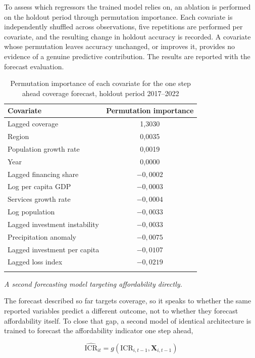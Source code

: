 \documentclass[pdflatex,sn-mathphys-num]{sn-jnl}%
\theoremstyle{thmstyleone}%
\theoremstyle{thmstyletwo}%
\theoremstyle{thmstylethree}%
\begin{document}
To assess which regressors the trained model relies on, an ablation is performed on the holdout period through permutation importance. Each covariate is independently shuffled across observations, five repetitions are performed per covariate, and the resulting change in holdout accuracy is recorded. A covariate whose permutation leaves accuracy unchanged, or improves it, provides no evidence of a genuine predictive contribution. The results are reported with the forecast evaluation.

\begin{table}[h]
\caption{Permutation importance of each covariate for the one step ahead coverage forecast, holdout period 2017--2022}\label{tab_ablation}
\begin{tabular}{@{}lc@{}}
\toprule
Covariate & Permutation importance \\
\midrule
Lagged coverage & 1,3030 \\
Region & 0,0035 \\
Population growth rate & 0,0019 \\
Year & 0,0000 \\
Lagged financing share & $-0{,}0002$ \\
Log per capita GDP & $-0{,}0003$ \\
Services growth rate & $-0{,}0004$ \\
Log population & $-0{,}0033$ \\
Lagged investment instability & $-0{,}0033$ \\
Precipitation anomaly & $-0{,}0075$ \\
Lagged investment per capita & $-0{,}0107$ \\
Lagged loss index & $-0{,}0219$ \\
\botrule
\end{tabular}
\end{table}

\textit{A second forecasting model targeting affordability directly.}

The forecast described so far targets coverage, so it speaks to whether the same reported variables predict a different outcome, not to whether they forecast affordability itself. To close that gap, a second model of identical architecture is trained to forecast the affordability indicator one step ahead,

\begin{equation}
\widehat{\text{ICR}}_{it} = g\left(\text{ICR}_{i,t-1}, \mathbf{X}_{i,t-1}\right)
\label{eq_ml_icr}
\end{equation}
\end{document}
